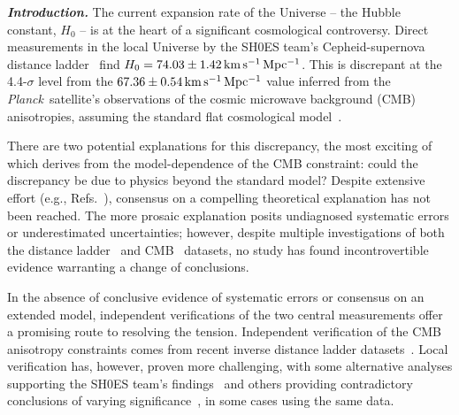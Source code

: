 \documentclass[%
 reprint,
 superscriptaddress,
 nofootinbib,
 amsmath,amssymb,
 aps,
]{revtex4-2}
\newcommand{\hubble}{\ensuremath{H_0}}
\newcommand{\kmsmpc}{\ensuremath{{\rm km\,s^{-1}\,Mpc^{-1}}}}
\newcommand{\planck}{{\it Planck}}
\begin{document}

\textbf{\emph{ Introduction.}} The current expansion rate of the Universe -- the Hubble constant, $H_0$ -- is at the heart of a significant cosmological controversy. Direct measurements in the local Universe by the SH0ES team's Cepheid-supernova distance ladder~\cite{Riess_etal:2019} find $\hubble = 74.03 \pm 1.42 \,\kmsmpc$. This is discrepant at the 4.4-$\sigma$ level from the $67.36 \pm 0.54\,\kmsmpc$ value inferred from the \planck\ satellite's observations of the cosmic microwave background (CMB) anisotropies, assuming the standard flat cosmological model~\cite{Planck_VI:2018}.

There are two potential explanations for this discrepancy, the most exciting of which derives from the model-dependence of the CMB constraint: could the discrepancy be due to physics beyond the standard model? Despite extensive effort (e.g., Refs.~\cite{Knox_Millea:2020,Vagnozzi:2020}), consensus on a compelling theoretical explanation has not been reached. The more prosaic explanation posits undiagnosed systematic errors or underestimated uncertainties; however, despite multiple investigations of both the distance ladder~\cite{Efstathiou:2014,*Rigault_etal:2015,*Jones_etal:2015,*Cardona_etal:2016,*Zhang_etal:2017,*Follin_Knox:2017,*Feeney_etal:2017,*Wu_Huterer:2017,*Dhawan_etal:2017,*Bengaly_etal:2018,*Rigault_etal:2018,*Jones_etal:2018,*Riess_etal:2020,*Efstathiou:2020} and CMB~\cite{Spergel_etal:2015,*Addison_etal:2016,*Obied_etal:2017,*Calabrese_etal:2017,*Efstathiou_Gratton:2019,*Motloch_Hu:2020,*ACT:2020} datasets, no study has found incontrovertible evidence warranting a change of conclusions.

In the absence of conclusive evidence of systematic errors or consensus on an extended model, independent verifications of the two central measurements offer a promising route to resolving the tension. Independent verification of the CMB anisotropy constraints comes from recent inverse distance ladder datasets~\cite{Addison_etal:2017,*DES_H_0:2017,*Philcox_etal:2020}. Local verification has, however, proven more challenging, with some alternative analyses supporting the SH0ES team's findings~\cite{Yuan_etal:2019,*Huang_etal:2020,*H0LICOW_XIII:2020,*TDCOSMO_I:2020,*Pesce_etal:2020} and others providing contradictory conclusions of varying significance~\cite{Freedman_etal:2019,*Freedman_etal:2020,*TDCOSMO_IV:2020,*Boruah_etal:2020}, in some cases using the same data.
\end{document}
